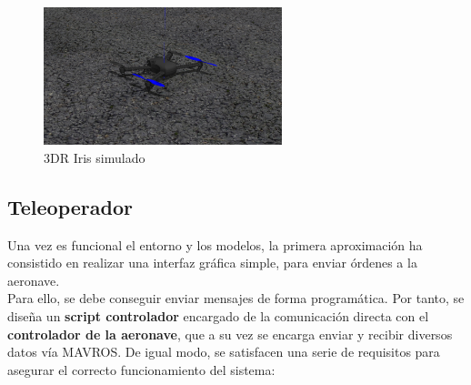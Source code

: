\begin{figure} [H]
	\begin{center}
	\includegraphics[height=4cm]{imagenes/cap4/1_px4_drone_gz.png}
	\end{center}
	\caption[3DR Iris simulado]{3DR Iris simulado}
	\label{fig:3dr_iris}
\end{figure}

\subsection{Teleoperador}
\label{subsec:teleoperador}

Una vez es funcional el entorno y los modelos, la primera aproximación ha consistido en realizar una interfaz gráfica simple, para enviar órdenes a la aeronave.\\

Para ello, se debe conseguir enviar mensajes de forma programática. Por tanto, se diseña un \textbf{script controlador} encargado de la comunicación directa con el \textbf{controlador de la aeronave}, que a su vez se encarga enviar y recibir diversos datos vía MAVROS. De igual modo, se satisfacen una serie de requisitos para asegurar el correcto funcionamiento del sistema:

